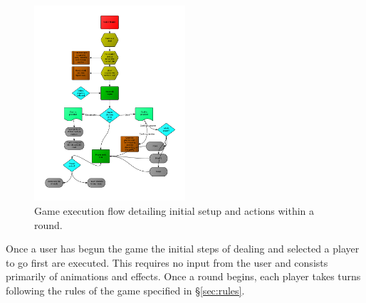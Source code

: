 \documentclass[12pt]{IEEEtran}
\begin{document}
	\begin{figure}[h]
		\centering
		\includegraphics[width=0.5\textwidth]{gameplay.png}
		\caption{Game execution flow detailing initial setup and actions within a round. }
		\label{fig:gameplay}
	\end{figure}

	Once a user has begun the game the initial steps of dealing and selected a player to go first are executed. This requires no input from the user and consists primarily of animations and effects. Once a round begins, each player takes turns following the rules of the game specified in \S\ref{sec:rules}. 
\end{document}
